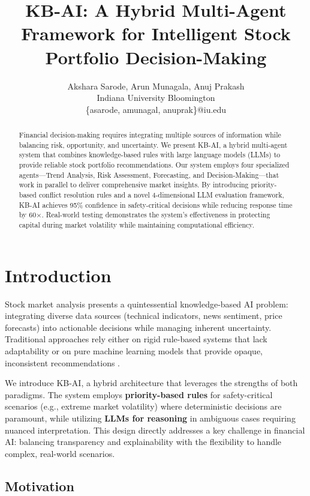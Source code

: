 \documentclass[11pt,letterpaper]{article}
\title{KB-AI: A Hybrid Multi-Agent Framework for Intelligent Stock Portfolio Decision-Making}
\author{
Akshara Sarode, Arun Munagala, Anuj Prakash \\
Indiana University Bloomington \\
\{asarode, amunagal, anuprak\}@iu.edu
}
\begin{document}
\maketitle

\begin{abstract}
Financial decision-making requires integrating multiple sources of information while balancing risk, opportunity, and uncertainty. We present KB-AI, a hybrid multi-agent system that combines knowledge-based rules with large language models (LLMs) to provide reliable stock portfolio recommendations. Our system employs four specialized agents—Trend Analysis, Risk Assessment, Forecasting, and Decision-Making—that work in parallel to deliver comprehensive market insights. By introducing priority-based conflict resolution rules and a novel 4-dimensional LLM evaluation framework, KB-AI achieves 95\% confidence in safety-critical decisions while reducing response time by 60×. Real-world testing demonstrates the system's effectiveness in protecting capital during market volatility while maintaining computational efficiency.
\end{abstract}

\section{Introduction}

Stock market analysis presents a quintessential knowledge-based AI problem: integrating diverse data sources (technical indicators, news sentiment, price forecasts) into actionable decisions while managing inherent uncertainty. Traditional approaches rely either on rigid rule-based systems that lack adaptability or on pure machine learning models that provide opaque, inconsistent recommendations \cite{tsai2011stock}.

We introduce KB-AI, a hybrid architecture that leverages the strengths of both paradigms. The system employs \textbf{priority-based rules} for safety-critical scenarios (e.g., extreme market volatility) where deterministic decisions are paramount, while utilizing \textbf{LLMs for reasoning} in ambiguous cases requiring nuanced interpretation. This design directly addresses a key challenge in financial AI: balancing transparency and explainability with the flexibility to handle complex, real-world scenarios.

\subsection{Motivation}
\end{document}

